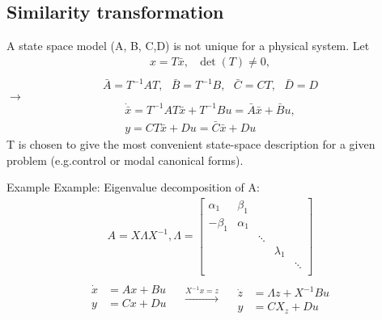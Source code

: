 \subsection{Similarity transformation}
\begin{frame}
A state space model (A, B, C,D) is not unique for a physical
system. Let
\begin{align*}
x=T\bar{x},\text{ }\det(T)\neq0,\\
\end{align*}
\vspace{-1.5cm}
\begin{align*}
\bar{A}=T^{-1}AT,\text{ } \bar{B}=T^{-1}B,\text{ } \bar{C}=CT,\text{ } \bar{D}=D
\end{align*}
$\rightarrow$
\vspace{-0.5cm}
\begin{align*}
\dot{\bar{x}}=T^{-1}AT\bar{x}+T^{-1}Bu=\bar{A}\bar{x}+\bar{B}u,\\
y=CT\bar{x}+Du=\bar{C}\bar{x}+Du
\end{align*}
T is chosen to give the most convenient state-space description
for a given problem (e.g.control or modal canonical
forms).
\end{frame}

\begin{frame}{Example}
Example: Eigenvalue decomposition of A:
\begin{align*}
A = X\Lambda X^{−1}
,\Lambda=\begin{bmatrix}
            \alpha_1 & \beta_1 & & & \\
            -\beta_1 & \alpha_1 & & & \\
             & &\ddots & & \\
            && & \lambda_1& \\
            &  & & &\ddots \\
       \end{bmatrix}\\
\end{align*}
  \vspace{-0.5cm}
\begin{equation*}
\begin{split}
    \dot{x} &= Ax+Bu\\
    y &= Cx+Du\\
  \end{split}
\quad\xrightarrow{X^{-1}x=z}\quad
  \begin{split}
    \dot{z}&=\Lambda z+X^{-1}Bu\\
   y &= CX_z+Du
  \end{split}
\end{equation*}
\end{frame}

